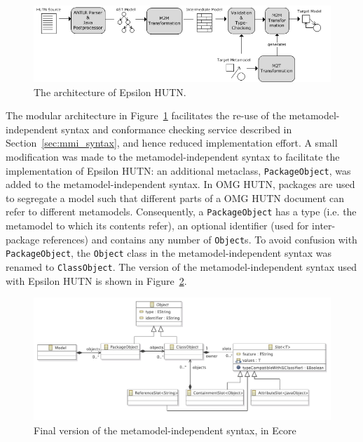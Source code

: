 \begin{figure}[htbp]
  \begin{center}
    \leavevmode
    \includegraphics[scale=0.44]{5.Implementation/hutn_workflow.png}
  \end{center}
  \caption{The architecture of Epsilon HUTN.}
  \label{fig:architecture}
\end{figure}

The modular architecture in Figure~\ref{fig:architecture} facilitates the re-use of the metamodel-independent syntax and conformance checking service described in Section~\ref{sec:mmi_syntax}, and hence reduced implementation effort. A small modification was made to the metamodel-independent syntax to facilitate the implementation of Epsilon HUTN: an additional metaclass, \texttt{Pa\-ck\-a\-geOb\-je\-ct}, was added to the metamodel-independent syntax. In OMG HUTN, packages are used to segregate a model such that different parts of a OMG HUTN document can refer to different metamodels. Consequently, a \texttt{Pa\-ck\-a\-geOb\-je\-ct} has a type (i.e. the metamodel to which its contents refer), an optional identifier (used for inter-package references) and contains any number of \texttt{Ob\-je\-ct}s. To avoid confusion with \texttt{Pa\-ck\-a\-geOb\-je\-ct}, the \texttt{Ob\-je\-ct} class in the metamodel-independent syntax was renamed to \texttt{Cl\-a\-ssOb\-je\-ct}. The version of the metamodel-independent syntax used with Epsilon HUTN is shown in Figure~\ref{fig:mmi_syntax_hutn}.

\begin{figure}[htbp]
  \centering
  \includegraphics[width=12cm]{5.Implementation/images/slot_model_final.pdf}
  \caption{Final version of the metamodel-independent syntax, in Ecore}
  \label{fig:mmi_syntax_hutn}
\end{figure}

